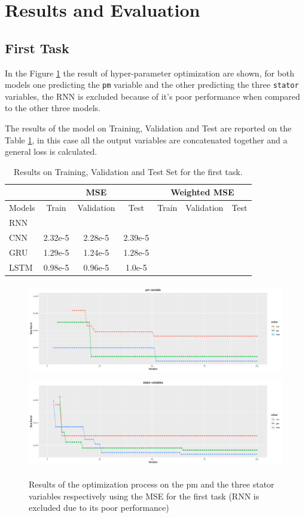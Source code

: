 \section{Results and Evaluation}
 
\subsection{First Task}
In the Figure \ref{fig:automl_mse} the result of hyper-parameter optimization are shown, for both models one predicting the \verb|pm| variable and the other predicting the three \verb|stator| variables, the RNN is excluded because of it's poor performance when compared to the other three models.

The results of the model on Training, Validation and Test are reported on the Table \ref{tab:first}, in this case all the output variables are concatenated together and a general loss is calculated.
\begin{table}[!h]
  \centering
  \begin{tabular}{|l|c|c|c|c|c|c|}
    \hline
    & \multicolumn{3}{|c|}{MSE} & \multicolumn{3}{|c|}{Weighted MSE} \\
    \hline
    Models & Train & Validation & Test & Train & Validation & Test \\
    \hline
    RNN & & & & & & \\
    CNN & 2.32e-5 & 2.28e-5  & 2.39e-5 & & & \\
    GRU & 1.29e-5 & 1.24e-5 & 1.28e-5 & & &\\
    LSTM & 0.98e-5 & 0.96e-5 & 1.0e-5 & & & \\
    \hline
  \end{tabular}
  \caption{Results on Training, Validation and Test Set for the first task.}
  \label{tab:first}
\end{table}
\begin{figure}[!h]
    \centering
    \includegraphics[width=\linewidth, height=4cm]{imgs/comparison_MSE.png}
    \includegraphics[width=\linewidth, height=4cm]{imgs/comparison_MSE_stator.png}
    \caption{Results of the optimization process on the pm and the three stator variables respectively using the MSE for the first task (RNN is excluded due to its poor performance)}
    \label{fig:automl_mse}
\end{figure}
  
